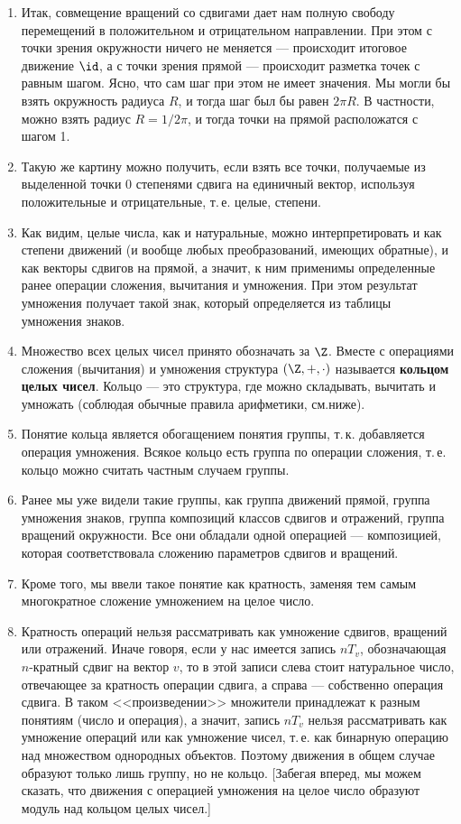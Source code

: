 \begin{enumerate}\setlength{\itemsep}{1pt}
\item Итак, совмещение вращений со сдвигами дает нам полную свободу перемещений в положительном и отрицательном направлении. При этом с точки зрения окружности ничего не меняется --- происходит итоговое движение $\id$, а с точки зрения прямой --- происходит разметка точек с равным шагом. Ясно, что сам шаг при этом не имеет значения. Мы могли бы взять окружность радиуса $R$, и тогда шаг был бы равен $2\pi R$. В частности, можно взять радиус $R=1/2\pi$, и тогда точки на прямой расположатся с шагом 1.
\item Такую же картину можно получить, если взять все точки, получаемые из выделенной точки 0 степенями сдвига на единичный вектор, используя положительные и отрицательные, т.\,е. целые, степени.
\item Как видим, целые числа, как и натуральные, можно интерпретировать и как степени движений (и вообще любых преобразований, имеющих обратные), и как векторы сдвигов на прямой, а значит, к ним применимы определенные ранее операции сложения, вычитания и умножения. При этом результат умножения получает такой знак, который определяется из таблицы умножения знаков.
\item Множество всех целых чисел принято обозначать за $\Z$. Вместе с операциями сложения (вычитания) и умножения структура $(\Z,+,\cdot)$ называется \textbf{кольцом целых чисел}. Кольцо --- это структура, где можно складывать, вычитать и умножать (соблюдая обычные правила арифметики, см.ниже).
\item Понятие кольца является обогащением понятия группы, т.\,к. добавляется операция умножения. Всякое кольцо есть группа по операции сложения, т.\,е. кольцо можно считать частным случаем группы.
\item Ранее мы уже видели такие группы, как группа движений прямой, группа умножения знаков, группа композиций классов сдвигов и отражений, группа вращений окружности. Все они обладали одной операцией --- композицией, которая соответствовала сложению параметров сдвигов и вращений.
\item Кроме того, мы ввели такое понятие как кратность, заменяя тем самым многократное сложение умножением на целое число.
\item Кратность операций нельзя рассматривать как умножение сдвигов, вращений или отражений. Иначе говоря, если у нас имеется запись $nT_v$, обозначающая $n$-кратный сдвиг на вектор $v$, то в этой записи слева стоит натуральное число, отвечающее за кратность операции сдвига, а справа --- собственно операция сдвига. В таком <<произведении>> множители принадлежат к разным понятиям (число и операция), а значит, запись $nT_v$ нельзя рассматривать как умножение операций или как умножение чисел, т.\,е. как бинарную операцию над множеством однородных объектов. Поэтому движения в общем случае образуют только лишь группу, но не кольцо. [Забегая вперед, мы можем сказать, что движения с операцией умножения на целое число образуют модуль над кольцом целых чисел.]

\end{enumerate}
